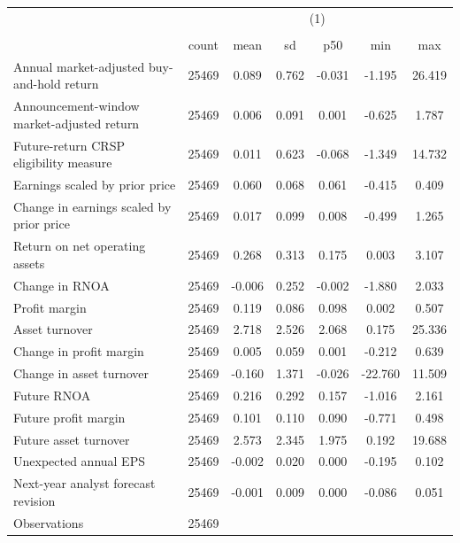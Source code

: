 {
\def\sym#1{\ifmmode^{#1}\else\(^{#1}\)\fi}
\begin{tabular}{l*{1}{cccccc}}
\hline\hline
                    &\multicolumn{6}{c}{(1)}                                                      \\
                    &\multicolumn{6}{c}{}                                                         \\
                    &       count&        mean&          sd&         p50&         min&         max\\
\hline
Annual market-adjusted buy-and-hold return&       25469&       0.089&       0.762&      -0.031&      -1.195&      26.419\\
Announcement-window market-adjusted return&       25469&       0.006&       0.091&       0.001&      -0.625&       1.787\\
Future-return CRSP eligibility measure&       25469&       0.011&       0.623&      -0.068&      -1.349&      14.732\\
Earnings scaled by prior price&       25469&       0.060&       0.068&       0.061&      -0.415&       0.409\\
Change in earnings scaled by prior price&       25469&       0.017&       0.099&       0.008&      -0.499&       1.265\\
Return on net operating assets&       25469&       0.268&       0.313&       0.175&       0.003&       3.107\\
Change in RNOA      &       25469&      -0.006&       0.252&      -0.002&      -1.880&       2.033\\
Profit margin       &       25469&       0.119&       0.086&       0.098&       0.002&       0.507\\
Asset turnover      &       25469&       2.718&       2.526&       2.068&       0.175&      25.336\\
Change in profit margin&       25469&       0.005&       0.059&       0.001&      -0.212&       0.639\\
Change in asset turnover&       25469&      -0.160&       1.371&      -0.026&     -22.760&      11.509\\
Future RNOA         &       25469&       0.216&       0.292&       0.157&      -1.016&       2.161\\
Future profit margin&       25469&       0.101&       0.110&       0.090&      -0.771&       0.498\\
Future asset turnover&       25469&       2.573&       2.345&       1.975&       0.192&      19.688\\
Unexpected annual EPS&       25469&      -0.002&       0.020&       0.000&      -0.195&       0.102\\
Next-year analyst forecast revision&       25469&      -0.001&       0.009&       0.000&      -0.086&       0.051\\
\hline
Observations        &       25469&            &            &            &            &            \\
\hline\hline
\end{tabular}
}

